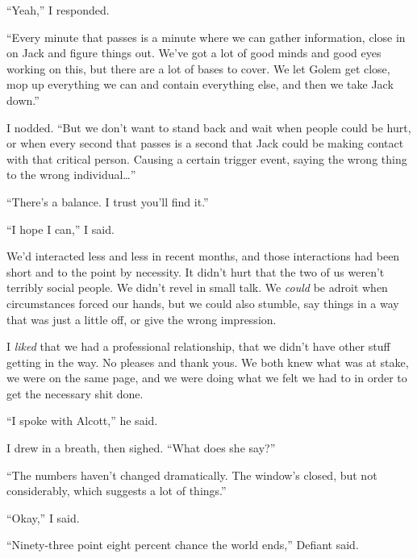 ``Yeah,'' I responded.



``Every minute that passes is a minute where we can gather information, close in on Jack and figure things out.  We've got a lot of good minds and good eyes working on this, but there are a lot of bases to cover.  We let Golem get close, mop up everything we can and contain everything else, and then we take Jack down.''



I nodded.  ``But we don't want to stand back and wait when people could be hurt, or when every second that passes is a second that Jack could be making contact with that critical person.  Causing a certain trigger event, saying the wrong thing to the wrong individual\ldots''



``There's a balance.  I trust you'll find it.''



``I hope I can,'' I said.



We'd interacted less and less in recent months, and those interactions had been short and to the point by necessity.  It didn't hurt that the two of us weren't terribly social people.  We didn't revel in small talk.  We \emph{could} be adroit when circumstances forced our hands, but we could also stumble, say things in a way that was just a little off, or give the wrong impression.



I \emph{liked} that we had a professional relationship, that we didn't have other stuff getting in the way.  No pleases and thank yous.  We both knew what was at stake, we were on the same page, and we were doing what we felt we had to in order to get the necessary shit done.



``I spoke with Alcott,'' he said.



I drew in a breath, then sighed.  ``What does she say?''



``The numbers haven't changed dramatically.  The window's closed, but not considerably, which suggests a lot of things.''



``Okay,'' I said.



``Ninety-three point eight percent chance the world ends,'' Defiant said.



